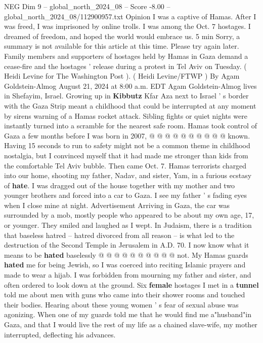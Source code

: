 \begin{textsample}{NEG Dim 9 – global\_north\_2024\_08 – Score -8.00 – global\_north\_2024\_08/112900957.txt}  \label{ex:f9_neg_087}
Opinion I was a captive of Hamas.
After I was freed, I was imprisoned by online trolls.
I was among the Oct. 7 hostages.
I dreamed of freedom, and hoped the world would embrace us. 5 min Sorry, a summary is not available for this article at this time.
Please try again later.
Family members and supporters of hostages held by Hamas in Gaza demand a cease-fire and the hostages ' release during a protest in Tel Aviv on Tuesday. ( Heidi Levine for The Washington Post ). ( Heidi Levine/FTWP ) By Agam Goldstein-Almog August 21, 2024 at 8:00 a.m.
EDT Agam Goldstein-Almog lives in Shefayim, Israel.
Growing up in \textbf{Kibbutz} Kfar Aza next to Israel ' s border with the Gaza Strip meant a childhood that could be interrupted at any moment by sirens warning of a Hamas rocket attack.
Sibling fights or quiet nights were instantly turned into a scramble for the nearest safe room.
Hamas took control of Gaza a few months before I was born in 2007, @ @ @ @ @ @ @ @ @ @ known.
Having 15 seconds to run to safety might not be a common theme in childhood nostalgia, but I convinced myself that it had made me stronger than kids from the comfortable Tel Aviv bubble.
Then came Oct. 7.
Hamas terrorists charged into our home, shooting my father, Nadav, and sister, Yam, in a furious ecstasy of \textbf{hate}.
I was dragged out of the house together with my mother and two younger brothers and forced into a car to Gaza.
I see my father ' s fading eyes when I close mine at night.
Advertisement Arriving in Gaza, the car was surrounded by a mob, mostly people who appeared to be about my own age, 17, or younger.
They smiled and laughed as I wept.
In Judaism, there is a tradition that baseless hatred -- hatred divorced from all reason -- is what led to the destruction of the Second Temple in Jerusalem in A.D. 70.
I now know what it means to be \textbf{hated} baselessly @ @ @ @ @ @ @ @ @ @ not.
My Hamas guards \textbf{hated} me for being Jewish, so I was coerced into reciting Islamic prayers and made to wear a hijab.
I was forbidden from mourning my father and sister, and often ordered to look down at the ground.
Six \textbf{female} hostages I met in a \textbf{tunnel} told me about men with guns who came into their shower rooms and touched their bodies.
Hearing about these young women ' s fear of sexual abuse was agonizing.
When one of my guards told me that he would find me a"husband"in Gaza, and that I would live the rest of my life as a chained slave-wife, my mother interrupted, deflecting his advances.

\end{textsample}
